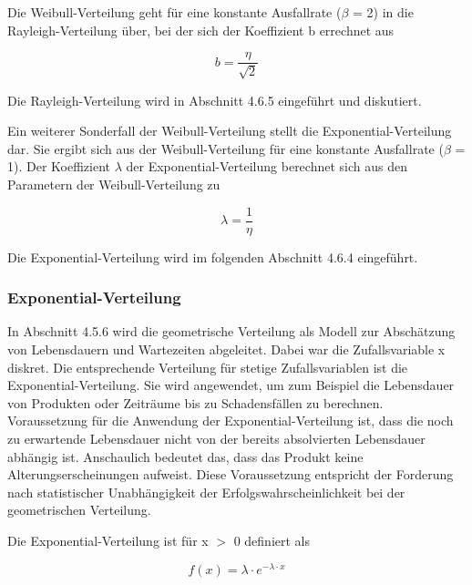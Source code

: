 \noindent Die Weibull-Verteilung geht f\"{u}r eine konstante Ausfallrate ($\beta$ = 2) in die Rayleigh-Verteilung \"{u}ber, bei der sich der Koeffizient b errechnet aus 

\begin{equation}\label{eq:fourhundredsninetythree}
b=\dfrac{\eta }{\sqrt{2}}
\end{equation}

\noindent Die Rayleigh-Verteilung wird in Abschnitt 4.6.5 eingef\"{u}hrt und diskutiert.\newline

\noindent Ein weiterer Sonderfall der Weibull-Verteilung stellt die Exponential-Verteilung dar. Sie ergibt sich aus der Weibull-Verteilung f\"{u}r eine konstante Ausfallrate ($\beta$ = 1). Der Koeffizient $\lambda$ der Exponential-Verteilung berechnet sich aus den Parametern der Weibull-Verteilung zu

\begin{equation}\label{eq:fourhundredsninetyfour}
\lambda =\dfrac{1}{\eta }
\end{equation}

Die Exponential-Verteilung wird im folgenden Abschnitt 4.6.4 eingef\"{u}hrt.


\subsubsection{Exponential-Verteilung}

\noindent In Abschnitt 4.5.6 wird die geometrische Verteilung als Modell zur Absch\"{a}tzung von Lebensdauern und Wartezeiten abgeleitet. Dabei war die Zufallsvariable x diskret. Die entsprechende Verteilung f\"{u}r stetige Zufallsvariablen ist die Exponential-Verteilung. Sie wird angewendet, um zum Beispiel die Lebensdauer von Produkten oder Zeitr\"{a}ume bis zu Schadensf\"{a}llen zu berechnen. Voraussetzung f\"{u}r die Anwendung der Exponential-Verteilung ist, dass die noch zu erwartende Lebensdauer nicht von der bereits absolvierten Lebensdauer abh\"{a}ngig ist. Anschaulich bedeutet das, dass das Produkt keine Alterungserscheinungen aufweist. Diese Voraussetzung entspricht der Forderung nach statistischer Unabh\"{a}ngigkeit der Erfolgswahrscheinlichkeit bei der geometrischen Verteilung. \newline

\noindent Die Exponential-Verteilung ist f\"{u}r x $\mathrm{>}$ 0 definiert als 

\begin{equation}\label{eq:fourhundredsninetyfive}
f(x)=\lambda \cdot e^{-\lambda \cdot x}
\end{equation}


